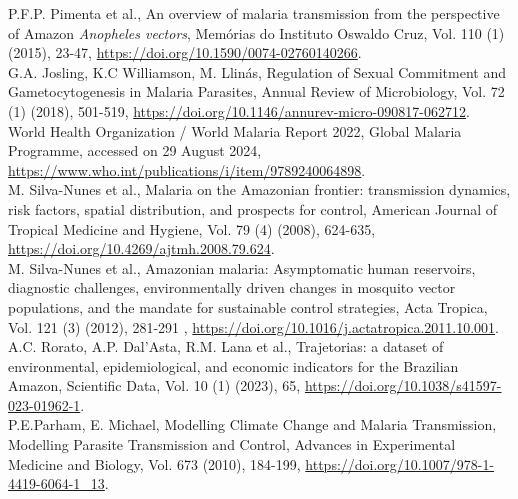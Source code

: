 \documentclass[a4paper,fleqn]{cas-dc}
\begin{document}
 \begin{thebibliography}{00}


 P.F.P. Pimenta et al., An overview of malaria transmission from the perspective of Amazon \emph{Anopheles vectors}, Memórias do Instituto Oswaldo Cruz, Vol. 110 (1) (2015), 23-47, \href{https://doi.org/10.1590/0074-02760140266}{https://doi.org/10.1590/0074-02760140266}.
\\
 G.A. Josling, K.C Williamson, M. Llinás, Regulation of Sexual Commitment and Gametocytogenesis in Malaria Parasites, Annual Review of Microbiology, Vol. 72 (1) (2018), 501-519, \href{https://doi.org/10.1146/annurev-micro-090817-062712}{https://doi.org/10.1146/annurev-micro-090817-062712}.
\\
 World Health Organization / World Malaria Report 2022, Global Malaria Programme, accessed on 29 August 2024, \href{https://www.who.int/publications/i/item/9789240064898}{https://www.who.int/publications/i/item/9789240064898}.
\\
 M. Silva-Nunes et al., Malaria on the Amazonian frontier: transmission dynamics, risk factors, spatial distribution, and prospects for control, American Journal of Tropical Medicine and Hygiene, Vol. 79 (4) (2008), 624-635, \href{https://doi.org/10.4269/ajtmh.2008.79.624}{https://doi.org/10.4269/ajtmh.2008.79.624}. 
\\
 M. Silva-Nunes et al.,  Amazonian malaria: Asymptomatic human reservoirs, diagnostic challenges, environmentally driven changes in mosquito vector populations, and the mandate for sustainable control strategies, Acta Tropica, Vol. 121 (3) (2012), 281-291 , \href{https://doi.org/10.1016/j.actatropica.2011.10.001}{https://doi.org/10.1016/j.actatropica.2011.10.001}.
\\
 A.C. Rorato, A.P. Dal’Asta, R.M. Lana et al., Trajetorias: a dataset of environmental, epidemiological, and economic indicators for the Brazilian Amazon, Scientific Data, Vol. 10 (1) (2023), 65, \href{https://doi.org/10.1038/s41597-023-01962-1}{https://doi.org/10.1038/s41597-023-01962-1}.
\\
 P.E.Parham, E. Michael, Modelling Climate Change and Malaria Transmission, Modelling Parasite Transmission and Control, Advances in Experimental Medicine and Biology, Vol. 673 (2010), 184-199, \href{https://doi.org/10.1007/978-1-4419-6064-1_13}{https://doi.org/10.1007/978-1-4419-6064-1\_13}.

\end{thebibliography}
\end{document}
